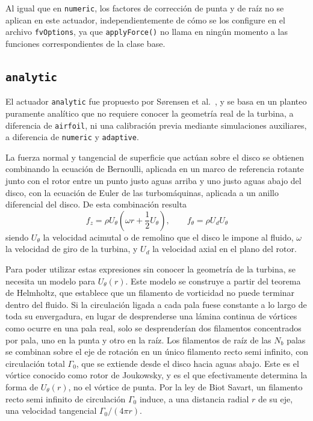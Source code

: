 Al igual que en \texttt{numeric}, los factores de corrección de punta y de raíz no se aplican en este actuador, independientemente de cómo se los configure en el archivo \texttt{fvOptions}, ya que \texttt{applyForce()} no llama en ningún momento a las funciones correspondientes de la clase base.

\subsection{\texttt{analytic}}
El actuador \texttt{analytic} fue propuesto por Sørensen et al.~\citep{sorensen2020}, y se basa en un planteo puramente analítico que no requiere conocer la geometría real de la turbina, a diferencia de \texttt{airfoil}, ni una calibración previa mediante simulaciones auxiliares, a diferencia de \texttt{numeric} y \texttt{adaptive}.

La fuerza normal y tangencial de superficie que actúan sobre el disco se obtienen combinando la ecuación de Bernoulli, aplicada en un marco de referencia rotante junto con el rotor entre un punto justo aguas arriba y uno justo aguas abajo del disco, con la ecuación de Euler de las turbomáquinas, aplicada a un anillo diferencial del disco. De esta combinación resulta
\begin{equation}
f_z = \rho U_\theta\left(\omega r + \frac{1}{2}U_\theta\right), \qquad f_\theta = \rho U_d U_\theta
\label{eq:analitico_fz}
\end{equation}
siendo $U_\theta$ la velocidad acimutal o de remolino que el disco le impone al fluido, $\omega$ la velocidad de giro de la turbina, y $U_d$ la velocidad axial en el plano del rotor.

Para poder utilizar estas expresiones sin conocer la geometría de la turbina, se necesita un modelo para $U_\theta(r)$. Este modelo se construye a partir del teorema de Helmholtz, que establece que un filamento de vorticidad no puede terminar dentro del fluido. Si la circulación ligada a cada pala fuese constante a lo largo de toda su envergadura, en lugar de desprenderse una lámina continua de vórtices como ocurre en una pala real, solo se desprenderían dos filamentos concentrados por pala, uno en la punta y otro en la raíz. Los filamentos de raíz de las $N_b$ palas se combinan sobre el eje de rotación en un único filamento recto semi infinito, con circulación total $\Gamma_0$, que se extiende desde el disco hacia aguas abajo. Este es el vórtice conocido como rotor de Joukowsky, y es el que efectivamente determina la forma de $U_\theta(r)$, no el vórtice de punta. Por la ley de Biot Savart, un filamento recto semi infinito de circulación $\Gamma_0$ induce, a una distancia radial $r$ de su eje, una velocidad tangencial $\Gamma_0/(4\pi r)$.

